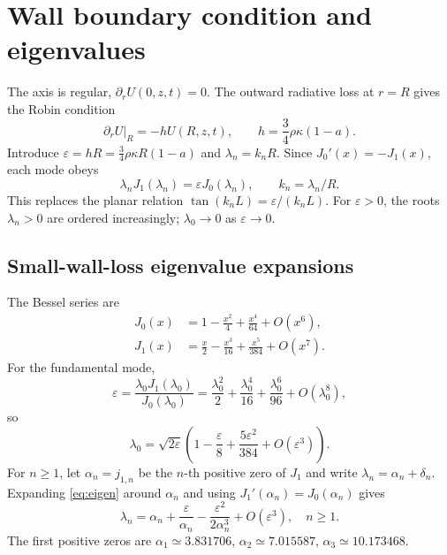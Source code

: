 \documentclass[11pt]{article}
\numberwithin{equation}{section}
\begin{document}
\section{Wall boundary condition and eigenvalues}
The axis is regular, $\partial_rU(0,z,t)=0$. The outward radiative loss at $r=R$ gives the Robin condition
\begin{equation}\left.\partial_r U\right|_{R}=-hU(R,z,t),\qquad h=\frac34\rho\kappa(1-a).\end{equation}
Introduce $\varepsilon=hR=\tfrac34\rho\kappa R(1-a)$ and $\lambda_n=k_nR$. Since $J_0'(x)=-J_1(x)$, each mode obeys
\begin{equation}\boxed{\lambda_nJ_1(\lambda_n)=\varepsilon J_0(\lambda_n),\qquad k_n=\lambda_n/R.}\label{eq:eigen}\end{equation}
This replaces the planar relation $\tan(k_nL)=\varepsilon/(k_nL)$. For $\varepsilon>0$, the roots $\lambda_n>0$ are ordered increasingly; $\lambda_0\to0$ as $\varepsilon\to0$.

\subsection{Small-wall-loss eigenvalue expansions}
The Bessel series are
\begin{align}J_0(x)&=1-\frac{x^2}{4}+\frac{x^4}{64}+O(x^6),\\
J_1(x)&=\frac{x}{2}-\frac{x^3}{16}+\frac{x^5}{384}+O(x^7).
\end{align}
For the fundamental mode,
\begin{equation}\varepsilon=\frac{\lambda_0J_1(\lambda_0)}{J_0(\lambda_0)}=\frac{\lambda_0^2}{2}+\frac{\lambda_0^4}{16}+\frac{\lambda_0^6}{96}+O(\lambda_0^8),\end{equation}
so
\begin{equation}\boxed{\lambda_0=\sqrt{2\varepsilon}\left(1-\frac{\varepsilon}{8}+\frac{5\varepsilon^2}{384}+O(\varepsilon^3)\right).}\end{equation}
For $n\ge1$, let $\alpha_n=j_{1,n}$ be the $n$-th positive zero of $J_1$ and write $\lambda_n=\alpha_n+\delta_n$. Expanding \eqref{eq:eigen} around $\alpha_n$ and using $J_1'(\alpha_n)=J_0(\alpha_n)$ gives
\begin{equation}\boxed{\lambda_n=\alpha_n+\frac{\varepsilon}{\alpha_n}-\frac{\varepsilon^2}{2\alpha_n^3}+O(\varepsilon^3),\quad n\ge1.}\end{equation}
The first positive zeros are $\alpha_1\simeq3.831706$, $\alpha_2\simeq7.015587$, $\alpha_3\simeq10.173468$.
\end{document}
